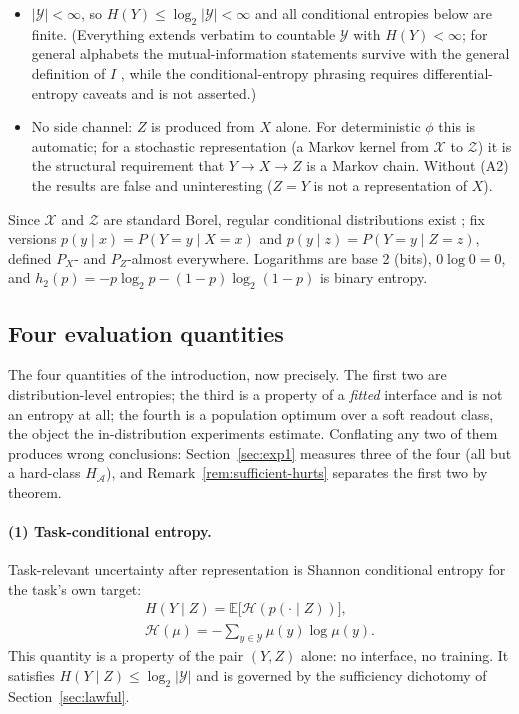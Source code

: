 \documentclass[twocolumn,10pt]{article}
\theoremstyle{definition}
\theoremstyle{remark}
\newcommand{\E}{\mathbb{E}}
\newcommand{\cA}{\mathcal{A}}
\newcommand{\cX}{\mathcal{X}}
\newcommand{\cY}{\mathcal{Y}}
\newcommand{\cZ}{\mathcal{Z}}
\newcommand{\cH}{\mathcal{H}}
\newcommand{\hb}{h_2}
\begin{document}
\begin{itemize}
\item[\textbf{(A1)}] $|\cY| < \infty$, so $H(Y) \le \log_2 |\cY| < \infty$
and all conditional entropies below are finite. (Everything extends
verbatim to countable $\cY$ with $H(Y) < \infty$; for general alphabets the
mutual-information statements survive with the general definition of $I$
\cite{polyanskiywu}, while the conditional-entropy phrasing requires
differential-entropy caveats and is not asserted.)
\item[\textbf{(A2)}] No side channel: $Z$ is produced from $X$ alone. For
deterministic $\phi$ this is automatic; for a stochastic representation
(a Markov kernel from $\cX$ to $\cZ$) it is the structural requirement that
$Y \to X \to Z$ is a Markov chain. Without (A2) the results are false and
uninteresting ($Z = Y$ is not a representation of $X$).
\end{itemize}

Since $\cX$ and $\cZ$ are standard Borel, regular conditional distributions
exist \cite{kallenberg}; fix versions $p(y \mid x) = P(Y = y \mid X = x)$
and $p(y \mid z) = P(Y = y \mid Z = z)$, defined $P_X$- and $P_Z$-almost
everywhere. Logarithms are base 2 (bits), $0 \log 0 = 0$, and
$\hb(p) = -p \log_2 p - (1-p)\log_2(1-p)$ is binary entropy.

\subsection{Four evaluation quantities}
\label{sec:three-quantities}

The four quantities of the introduction, now precisely. The first two
are distribution-level entropies; the third is a property of a
\emph{fitted} interface and is not an entropy at all; the fourth is a
population optimum over a soft readout class, the object the
in-distribution experiments estimate. Conflating any two of them
produces wrong conclusions: Section~\ref{sec:exp1} measures three of
the four (all but a hard-class $H_{\cA}$), and
Remark~\ref{rem:sufficient-hurts} separates the first two by theorem.

\paragraph{(1) Task-conditional entropy.} Task-relevant uncertainty after
representation is Shannon conditional entropy for the task's own target:
\begin{gather*}
H(Y \mid Z) = \E\big[\cH(p(\cdot \mid Z))\big],
\\
\cH(\mu) = -\textstyle\sum_{y \in \cY} \mu(y)\log \mu(y).
\end{gather*}
This quantity is a property of the pair $(Y, Z)$ alone: no interface, no
training. It satisfies $H(Y \mid Z) \le \log_2 |\cY|$ and is governed by
the sufficiency dichotomy of Section~\ref{sec:lawful}.
\end{document}
